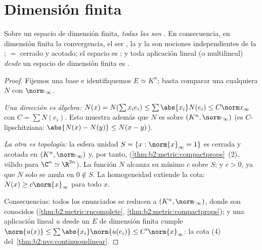 \section{Dimensión finita}

\begin{theorem}\label{thm:b2:nvs:finitedim}
Sobre un espacio de dimensión finita, \emph{todas las  son
}. En consecuencia, en
dimensión finita la convergencia, el ser , la  y la
 son nociones independientes de la ;  $=$
cerrado y acotado; el espacio es ; y toda aplicación lineal
(o multilineal) \emph{desde} un espacio de dimensión finita es
.
\end{theorem}

\begin{proof}
Fijemos una base e identifiquemos $E \simeq K^n$; basta comparar una
 cualquiera $N$ con $\norm\cdot_\infty$.

\emph{Una dirección es álgebra:} $N(x) = N(\sum x_i e_i) \leq \sum
\abs{x_i} N(e_i) \leq C \norm x_\infty$ con $C = \sum N(e_i)$. Esto
muestra además que $N$ es  sobre $(K^n,
\norm\cdot_\infty)$ (es $C$-lipschitziana: $\abs{N(x) - N(y)} \leq
N(x - y)$).

\emph{La otra es topología:} la esfera unidad $S = \{x :
\norm{x}_\infty = 1\}$ es cerrada y acotada en $(K^n,
\norm\cdot_\infty)$ y, por tanto, 
(\cref{thm:b2:metric:compactprops}~(2), válido para $\C^n \simeq
\R^{2n}$). La función  $N$ alcanza su mínimo $c$ sobre $S$;
y $c > 0$, ya que $N$ solo se anula en $0 \notin S$. La homogeneidad
extiende la cota: $N(x) \geq c \norm{x}_\infty$ para todo $x$.

Consecuencias: todos los enunciados se reducen a $(K^n,
\norm\cdot_\infty)$, donde son conocidos
(\cref{thm:b2:metric:rncomplete},
\cref{thm:b2:metric:compactprops}); y una aplicación lineal $u$
desde un $E$ de dimensión finita cumple $\norm{u(x)} \leq
\sum\abs{x_i} \norm{u(e_i)} \leq C'\norm{x}_\infty$: la cota (4) del~\cref{thm:b2:nvs:continuouslinear}.
\end{proof}

